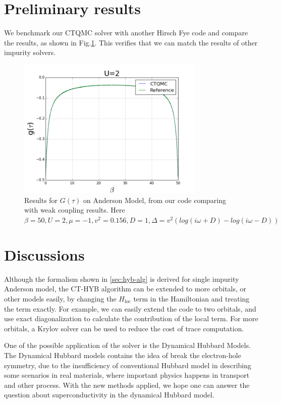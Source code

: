 
\section{Preliminary results}
We benchmark our CTQMC solver with another Hirsch Fye code and compare the results,
as shown in Fig.\ref{fig:u2}. This verifies that we can match the results of 
other impurity solvers.

\begin{figure}
  \centering
  \label{fig:u2}
  \includegraphics[width=0.8\textwidth] {img/U=2.png}
  \caption{Results for $G(\tau)$ on Anderson Model, from our code comparing with
weak coupling results.
Here $\beta = 50, U = 2, \mu = −1, v^2 = 0.156, D = 1, \Delta = v^2(log(i\omega + D) − log(i\omega − D))$}
\end{figure}



\section{Discussions\label{sec:hyb-concl}}

Although the formalism shown in \ref{sec:hyb-alg} is derived for single 
impurity Anderson model, the CT-HYB algorithm can be extended to more orbitals,
or other models easily, by changing the $H_\textrm{loc}$ term in the Hamiltonian 
and treating the term exactly. For example, we can easily extend the code to two
orbitals, and use exact diagonalization to calculate the contribution of the 
local term. For more orbitals, a Krylov solver \cite{PhysRevB.80.235117} can be used to reduce the cost of
trace computation.

One of the possible application of the solver is the Dynamical Hubbard Models. 
The Dynamical Hubbard models contains the idea of break the electron-hole 
symmetry, due to the insufficiency of conventional Hubbard model in describing 
some scenarios in real materials, where important physics happens in transport 
and other process. With the new methods applied, we hope one can answer the question 
about superconductivity in the dynamical Hubbard model. 

